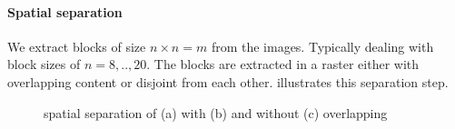 \paragraph{Spatial separation}
We extract blocks of size $n \times n=m$ from the images. Typically dealing with
block sizes of $n=8,..,20$. The blocks are extracted in a raster either with
overlapping content or disjoint from each other. 
illustrates this separation step. 
\begin{figure}[h]
\centering
{}
\hspace{5mm}
\hspace{5mm}
\caption[spatial separation]{spatial separation of (a) with (b) and without (c)
overlapping}\label{fig:separation}
\end{figure}

